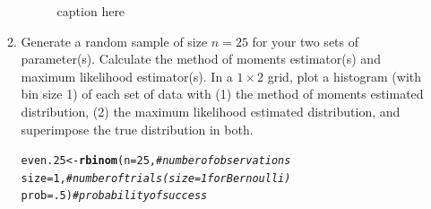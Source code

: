 \documentclass{article}\usepackage[]{graphicx}\usepackage[]{color}
\makeatletter
\newcommand{\hlnum}[1]{\textcolor[rgb]{0.686,0.059,0.569}{#1}}%
\newcommand{\hlcom}[1]{\textcolor[rgb]{0.678,0.584,0.686}{\textit{#1}}}%
\newcommand{\hlstd}[1]{\textcolor[rgb]{0.345,0.345,0.345}{#1}}%
\newcommand{\hlkwb}[1]{\textcolor[rgb]{0.69,0.353,0.396}{#1}}%
\newcommand{\hlkwc}[1]{\textcolor[rgb]{0.333,0.667,0.333}{#1}}%
\newcommand{\hlkwd}[1]{\textcolor[rgb]{0.737,0.353,0.396}{\textbf{#1}}}%
\newenvironment{kframe}{%
 \def\at@end@of@kframe{}%
 \ifinner\ifhmode%
  \def\at@end@of@kframe{\end{minipage}}%
  \begin{minipage}{\columnwidth}%
 \fi\fi%
 \def\FrameCommand##1{\hskip\@totalleftmargin \hskip-\fboxsep
 \colorbox{shadecolor}{##1}\hskip-\fboxsep
     \hskip-\linewidth \hskip-\@totalleftmargin \hskip\columnwidth}%
 \MakeFramed {\advance\hsize-\width
   \@totalleftmargin\z@ \linewidth\hsize
   \@setminipage}}%
 {\par\unskip\endMakeFramed%
 \at@end@of@kframe}
\newenvironment{knitrout}{}{} %
\makeatother
\begin{document}
\begin{enumerate}
\begin{enumerate}
\begin{figure}[H]
\begin{center}
\begin{knitrout}
\end{knitrout}
    \caption{caption here}
    \label{p4plot2}%
  \end{center}
\end{figure}
  \item Generate a random sample of size $n=25$ for your two sets of parameter(s). 
  Calculate the method of moments estimator(s) and maximum likelihood estimator(s).
  In a $1 \times 2$ grid, plot a histogram (with bin size 1) of each set of data 
  with (1) the method of moments estimated distribution, (2) the maximum likelihood 
  estimated distribution, and superimpose the true distribution in both.
\begin{knitrout}
\color{fgcolor}\begin{kframe}
\begin{alltt}
\hlstd{even.25} \hlkwb{<-} \hlkwd{rbinom}\hlstd{(}\hlkwc{n}\hlstd{=}\hlnum{25}\hlstd{,}        \hlcom{#number of observations}
                  \hlkwc{size}\hlstd{=}\hlnum{1}\hlstd{,}        \hlcom{#number of trials (size=1 for Bernoulli)}
                  \hlkwc{prob}\hlstd{=}\hlnum{.5}\hlstd{)}       \hlcom{#probability of success}


\end{alltt}
\end{kframe}
\end{knitrout}
\end{enumerate}
\end{enumerate}
\end{document}

